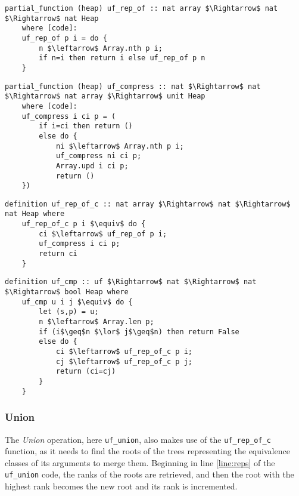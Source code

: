 \documentclass[headsepline,footsepline,footinclude=false,oneside,fontsize=11pt,paper=a4,listof=totoc,bibliography=totoc]{scrbook} %
\begin{document}
\begin{lstlisting}[mathescape=true,caption=The Representative Search Function,captionpos=b]
	partial_function (heap) uf_rep_of :: nat array $\Rightarrow$ nat $\Rightarrow$ nat Heap
	where [code]: 
	uf_rep_of p i = do {
		n $\leftarrow$ Array.nth p i;
		if n=i then return i else uf_rep_of p n
	}
\end{lstlisting}
\vspace{-0.2cm}
\begin{lstlisting}[mathescape=true,caption=The Iterated Path Compression Function,captionpos=b]
	partial_function (heap) uf_compress :: nat $\Rightarrow$ nat $\Rightarrow$ nat array $\Rightarrow$ unit Heap
	where [code]: 
	uf_compress i ci p = (
		if i=ci then return ()
		else do {
			ni $\leftarrow$ Array.nth p i;
			uf_compress ni ci p;
			Array.upd i ci p;
			return ()
	})
\end{lstlisting}
\vspace{-0.2cm}
\begin{lstlisting}[mathescape=true,caption=The Representative Search and Compression Function,captionpos=b]	
	definition uf_rep_of_c :: nat array $\Rightarrow$ nat $\Rightarrow$ nat Heap where 
	uf_rep_of_c p i $\equiv$ do {
		ci $\leftarrow$ uf_rep_of p i;
		uf_compress i ci p;
		return ci
	}
\end{lstlisting}
\vspace{-0.2cm}
\begin{lstlisting}[mathescape=true,caption=The Find Operation,captionpos=b]	
	definition uf_cmp :: uf $\Rightarrow$ nat $\Rightarrow$ nat $\Rightarrow$ bool Heap where
	uf_cmp u i j $\equiv$ do {
		let (s,p) = u;
		n $\leftarrow$ Array.len p;
		if (i$\geq$n $\lor$ j$\geq$n) then return False
		else do {
			ci $\leftarrow$ uf_rep_of_c p i;
			cj $\leftarrow$ uf_rep_of_c p j;
			return (ci=cj)
		}
	}
\end{lstlisting}

\subsubsection{Union}
The \textit{Union} operation, here \verb|uf_union|, also makes use of the \verb|uf_rep_of_c| function, as it needs to find the roots of the trees representing the equivalence classes of its arguments to merge them. Beginning in line \ref{line:reps} of the \verb|uf_union| code, the ranks of the roots are retrieved, and then the root with the highest rank becomes the new root and its rank is incremented.
\end{document}
